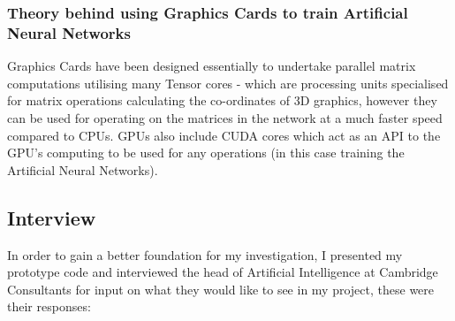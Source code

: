 \documentclass[./project-report/src/latex/project-report.tex]{subfiles}
\begin{document}
\subsubsection{Theory behind using Graphics Cards to train Artificial Neural Networks}
\vspace{5mm}

Graphics Cards have been designed essentially to undertake parallel matrix computations utilising many Tensor cores - which are processing units specialised for matrix operations 
calculating the co-ordinates of 3D graphics, however they can be used for operating on the matrices in the network at a much faster speed compared to CPUs. GPUs also include CUDA 
cores which act as an API to the GPU's computing to be used for any operations (in this case training the Artificial Neural Networks).

\subsection{Interview}

In order to gain a better foundation for my investigation, I presented my prototype code and interviewed the head of Artificial Intelligence at Cambridge Consultants 
for input on what they would like to see in my project, these were their responses:
\end{document}
